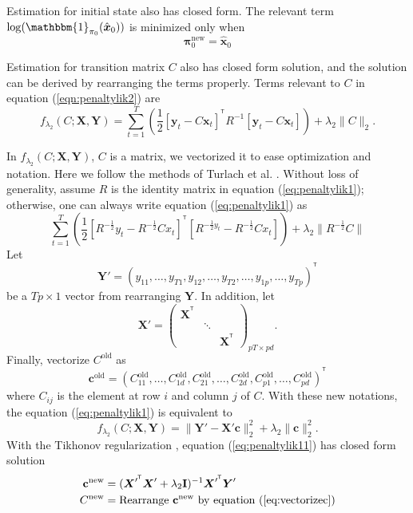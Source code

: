 \documentclass[fleqn]{article}
\let\oldref\ref
\renewcommand{\ref}[1]{(\oldref{#1})}
\newcommand{\T}{^{\ensuremath{\mathsf{T}}}}           %
\providecommand{\mb}[1]{\boldsymbol{#1}}
\newcommand{\bx}{\mb{x}}
\newcommand{\by}{\mb{y}}
\newcommand{\bX}{\mb{X}}
\newcommand{\bY}{\mb{Y}}
\begin{document}
Estimation for initial state also has closed form. The relevant term $\log(\mathbbm{1}_{\mathbf{\pi}_0}(\hat{\bx}_0))$ is minimized only when
\begin{equation*}\label{eq:updatepi}
\mathbf{\pi}_0^{\text{new}} = \hat{\bx}_0
\end{equation*}

Estimation for transition matrix $C$ also has closed form solution, and the solution can be derived by rearranging the terms properly. Terms relevant to $C$ in equation \ref{eqn:penaltylik2} are
\begin{equation}\label{eq:penaltylik1}
f_{\lambda_2}(C;\bX,\bY) = \sum\limits_{t=1}^{T}\left(\frac{1}{2}[\by_t-C\bx_t]^{\T}R^{-1}[\by_t-C\bx_t]\right)+\lambda_2 \|C\|_2.
\end{equation}

In $f_{\lambda_2}(C;\bX,\bY)$, $C$ is a matrix, we vectorized it to ease optimization and notation. Here we follow the methods of Turlach et al. \cite{turlach2005simultaneous}. Without loss of generality, assume $R$ is the identity matrix in equation \ref{eq:penaltylik1}; otherwise, one can always write equation \ref{eq:penaltylik1} as
\begin{equation*}
\sum\limits_{t=1}^{T}\left(\frac{1}{2}[R^{-\frac{1}{2}}y_t-R^{-\frac{1}{2}}Cx_t]^{\T}[R^{-\frac{1}{2}y_t}-R^{-\frac{1}{2}}Cx_t]\right) + \lambda_2 \|R^{-\frac{1}{2}}C\|
\end{equation*}
Let
\begin{equation*}
\bY' = (y_{11},\ldots,y_{T1},y_{12},\ldots,y_{T2},\ldots,y_{1p},\ldots,y_{Tp})^{\T}
\end{equation*}
be a $Tp\times 1$ vector from rearranging  $\bY$. In addition, let
\[
\bX' = \begin{pmatrix}
\bX^{\T}&&\\
&\ddots&\\
&&\bX^{\T}
\end{pmatrix}_{pT\times pd}.
\]
Finally, vectorize $C^{\text{old}}$ as
\begin{equation}\label{eq:vectorizec}
\mathbf{c}^{\text{old}} = (C_{11}^{\text{old}},\ldots,C_{1d}^{\text{old}},C_{21}^{\text{old}},\ldots,C_{2d}^{\text{old}},C_{p1}^{\text{old}},\ldots,C_{pd}^{\text{old}})^{\T}
\end{equation}
where $C_{ij}$ is the element at row $i$ and column $j$ of $C$. With these new notations, the equation \ref{eq:penaltylik1} is equivalent to
\begin{equation}\label{eq:penaltylik11}
f_{\lambda_2}(C;\bX,\bY) = \|\bY'  - \mathbf{X' c}\|_2^2 + \lambda_2\|\mathbf{c}\|_2^2.
\end{equation}
With the Tikhonov regularization \cite{tikhonov1943stability}, equation \ref{eq:penaltylik11} has closed form solution
\begin{equation}\label{eq:updatec}
\begin{aligned}
\mathbf{c}^{\text{new}} &= (\bX'^{\T}\bX' + \lambda_2\mathbf{I})^{-1}\bX'^{\T}\bY'\\
C^{\text{new}} &=\text{Rearrange } \mathbf{c}^{\text{new}} \text{ by equation }\ref{eq:vectorizec}
\end{aligned}
\end{equation}
\end{document}
